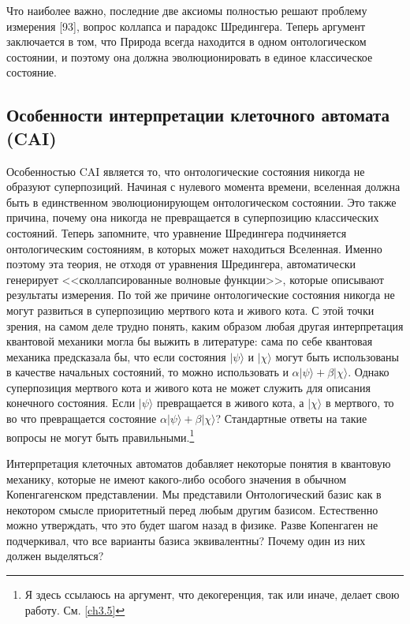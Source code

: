 \documentclass[main.tex]{subfiles}
\begin{document}
Что наиболее важно, последние две аксиомы полностью решают проблему измерения [93], вопрос коллапса и парадокс Шредингера. Теперь аргумент заключается в том, что Природа всегда находится в одном онтологическом состоянии, и поэтому она должна эволюционировать в единое классическое состояние.

\subsection{Особенности интерпретации клеточного автомата (CAI)}\label{ch5.5}

Особенностью CAI является то, что онтологические состояния никогда не образуют суперпозиций. Начиная с нулевого момента времени, вселенная должна быть в единственном эволюционирующем онтологическом состоянии. Это также причина, почему она никогда не превращается в суперпозицию классических состояний. Теперь запомните, что уравнение Шредингера подчиняется онтологическим состояниям, в которых может находиться Вселенная. Именно поэтому эта теория, не отходя от уравнения Шредингера, автоматически генерирует <<сколлапсированные волновые функции>>, которые описывают результаты измерения. По той же причине онтологические состояния никогда не могут развиться в суперпозицию мертвого кота и живого кота. С этой точки зрения, на самом деле трудно понять, каким образом любая другая интерпретация квантовой механики могла бы выжить в литературе: сама по себе квантовая механика предсказала бы, что если состояния $|\psi\rangle$ и $|\chi\rangle$ могут быть использованы в качестве начальных состояний, то можно использовать и $\alpha|\psi\rangle + \beta|\chi\rangle$. Однако суперпозиция мертвого кота и живого кота не может служить для описания конечного состояния. Если $|\psi\rangle$ превращается в живого кота, а $|\chi\rangle$ в мертвого, то во что превращается состояние $\alpha|\psi\rangle + \beta|\chi\rangle$? Стандартные ответы на такие вопросы не могут быть правильными.\footnote{Я здесь ссылаюсь на аргумент, что декогеренция, так или иначе, делает свою работу. См. \ref{ch3.5}}

Интерпретация клеточных автоматов добавляет некоторые понятия в квантовую механику, которые не имеют какого-либо особого значения в обычном Копенгагенском представлении. Мы представили Онтологический базис как в некотором смысле приоритетный перед любым другим базисом. Естественно можно утверждать, что это будет шагом назад в физике. Разве Копенгаген не подчеркивал, что все варианты базиса эквивалентны?
Почему один из них должен выделяться?
\end{document}
